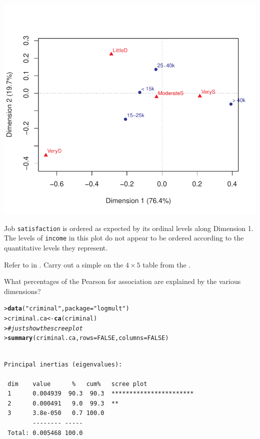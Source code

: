 \documentclass[10pt]{report}\usepackage[]{graphicx}\usepackage[]{color}
\makeatletter
\newcommand{\hlnum}[1]{\textcolor[rgb]{0.686,0.059,0.569}{#1}}%
\newcommand{\hlstr}[1]{\textcolor[rgb]{0.192,0.494,0.8}{#1}}%
\newcommand{\hlcom}[1]{\textcolor[rgb]{0.678,0.584,0.686}{\textit{#1}}}%
\newcommand{\hlstd}[1]{\textcolor[rgb]{0.345,0.345,0.345}{#1}}%
\newcommand{\hlkwb}[1]{\textcolor[rgb]{0.69,0.353,0.396}{#1}}%
\newcommand{\hlkwc}[1]{\textcolor[rgb]{0.333,0.667,0.333}{#1}}%
\newcommand{\hlkwd}[1]{\textcolor[rgb]{0.737,0.353,0.396}{\textbf{#1}}}%
\newenvironment{kframe}{%
 \def\at@end@of@kframe{}%
 \ifinner\ifhmode%
  \def\at@end@of@kframe{\end{minipage}}%
  \begin{minipage}{\columnwidth}%
 \fi\fi%
 \def\FrameCommand##1{\hskip\@totalleftmargin \hskip-\fboxsep
 \colorbox{shadecolor}{##1}\hskip-\fboxsep
     \hskip-\linewidth \hskip-\@totalleftmargin \hskip\columnwidth}%
 \MakeFramed {\advance\hsize-\width
   \@totalleftmargin\z@ \linewidth\hsize
   \@setminipage}}%
 {\par\unskip\endMakeFramed%
 \at@end@of@kframe}
\newenvironment{knitrout}{}{} %
\renewenvironment{knitrout}{\small\renewcommand{\baselinestretch}{.85}}{} %
\makeatother
\begin{document}
\begin{Exercises}
\begin{enumerate*}
\begin{ans}
\begin{knitrout}
\centerline{\includegraphics[width=.5\textwidth]{soln/fig/ex6_1b-1} }



\end{knitrout}
    Job \texttt{satisfaction} is ordered as expected by its ordinal levels along Dimension 1. The levels of \texttt{income}
    in this plot do not appear to be ordered according to the quantitative levels they represent.
    \end{ans}
    
  \end{enumerate*}
  
  \exercise Refer to  in .  Carry out a simple \ca on the
  $4 \times 5$ table  from the .
  \begin{enumerate*}
    \item What percentages of the Pearson \chisq for association are explained
    by the various dimensions?
    \begin{ans}
\begin{knitrout}\footnotesize
{}\color{fgcolor}\begin{kframe}
\begin{alltt}
\hlstd{> }\hlkwd{data}\hlstd{(}\hlstr{"criminal"}\hlstd{,} \hlkwc{package} \hlstd{=} \hlstr{"logmult"}\hlstd{)}
\hlstd{> }\hlstd{criminal.ca} \hlkwb{<-} \hlkwd{ca}\hlstd{(criminal)}
\hlstd{> }     \hlcom{# just show the scree plot}
\hlstd{> }\hlkwd{summary}\hlstd{(criminal.ca,} \hlkwc{rows}\hlstd{=}\hlnum{FALSE}\hlstd{,} \hlkwc{columns}\hlstd{=}\hlnum{FALSE}\hlstd{)}
\end{alltt}
\begin{verbatim}

Principal inertias (eigenvalues):

 dim    value      %   cum%   scree plot               
 1      0.004939  90.3  90.3  ***********************  
 2      0.000491   9.0  99.3  **                       
 3      3.8e-050   0.7 100.0                           
        -------- -----                                 
 Total: 0.005468 100.0                                 
\end{verbatim}
\end{kframe}
\end{knitrout}
    \end{ans}
    

\end{enumerate*}
\end{Exercises}
\end{document}

